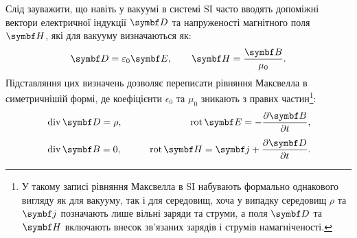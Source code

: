 Слід зауважити, що навіть у вакуумі в системі SI часто вводять допоміжні вектори електричної індукції \(\Dfield\) та напруженості магнітного поля \(\Hfield\), які для вакууму визначаються як:
\begin{equation*}
	\Dfield = \epsilon_0 \Efield, \qquad \Hfield = \frac{\Bfield}{\mu_0}.
\end{equation*}
Підставляння цих визначень дозволяє переписати рівняння Максвелла в симетричнішій формі, де коефіцієнти \(\epsilon_0\) та \(\mu_0\) зникають з правих частин\footnote{У такому записі рівняння Максвелла в SI набувають формально однакового вигляду як для вакууму, так і для середовищ, хоча у випадку середовищ \(\rho\) та \(\vect{j}\) позначають лише вільні заряди та струми, а поля \(\Dfield\) та \(\Hfield\) включають внесок зв'язаних зарядів і струмів намагніченості.}:
\begin{equation*}
	\begin{aligned}
		 & \Div\Dfield = \rho, \qquad
		 & \Rot\Efield = -\frac{\partial \Bfield}{\partial t},           \\[4pt]
		 & \Div\Bfield = 0, \qquad
		 & \Rot\Hfield = \vect{j} + \frac{\partial \Dfield}{\partial t}.
	\end{aligned}
\end{equation*}
